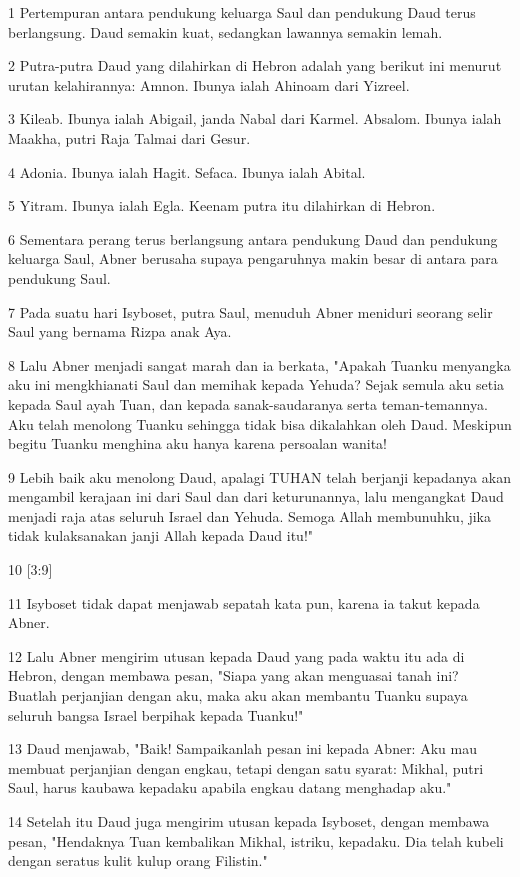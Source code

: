 \par 1 Pertempuran antara pendukung keluarga Saul dan pendukung Daud terus berlangsung. Daud semakin kuat, sedangkan lawannya semakin lemah.
\par 2 Putra-putra Daud yang dilahirkan di Hebron adalah yang berikut ini menurut urutan kelahirannya: Amnon. Ibunya ialah Ahinoam dari Yizreel.
\par 3 Kileab. Ibunya ialah Abigail, janda Nabal dari Karmel. Absalom. Ibunya ialah Maakha, putri Raja Talmai dari Gesur.
\par 4 Adonia. Ibunya ialah Hagit. Sefaca. Ibunya ialah Abital.
\par 5 Yitram. Ibunya ialah Egla. Keenam putra itu dilahirkan di Hebron.
\par 6 Sementara perang terus berlangsung antara pendukung Daud dan pendukung keluarga Saul, Abner berusaha supaya pengaruhnya makin besar di antara para pendukung Saul.
\par 7 Pada suatu hari Isyboset, putra Saul, menuduh Abner meniduri seorang selir Saul yang bernama Rizpa anak Aya.
\par 8 Lalu Abner menjadi sangat marah dan ia berkata, "Apakah Tuanku menyangka aku ini mengkhianati Saul dan memihak kepada Yehuda? Sejak semula aku setia kepada Saul ayah Tuan, dan kepada sanak-saudaranya serta teman-temannya. Aku telah menolong Tuanku sehingga tidak bisa dikalahkan oleh Daud. Meskipun begitu Tuanku menghina aku hanya karena persoalan wanita!
\par 9 Lebih baik aku menolong Daud, apalagi TUHAN telah berjanji kepadanya akan mengambil kerajaan ini dari Saul dan dari keturunannya, lalu mengangkat Daud menjadi raja atas seluruh Israel dan Yehuda. Semoga Allah membunuhku, jika tidak kulaksanakan janji Allah kepada Daud itu!"
\par 10 [3:9]
\par 11 Isyboset tidak dapat menjawab sepatah kata pun, karena ia takut kepada Abner.
\par 12 Lalu Abner mengirim utusan kepada Daud yang pada waktu itu ada di Hebron, dengan membawa pesan, "Siapa yang akan menguasai tanah ini? Buatlah perjanjian dengan aku, maka aku akan membantu Tuanku supaya seluruh bangsa Israel berpihak kepada Tuanku!"
\par 13 Daud menjawab, "Baik! Sampaikanlah pesan ini kepada Abner: Aku mau membuat perjanjian dengan engkau, tetapi dengan satu syarat: Mikhal, putri Saul, harus kaubawa kepadaku apabila engkau datang menghadap aku."
\par 14 Setelah itu Daud juga mengirim utusan kepada Isyboset, dengan membawa pesan, "Hendaknya Tuan kembalikan Mikhal, istriku, kepadaku. Dia telah kubeli dengan seratus kulit kulup orang Filistin."
